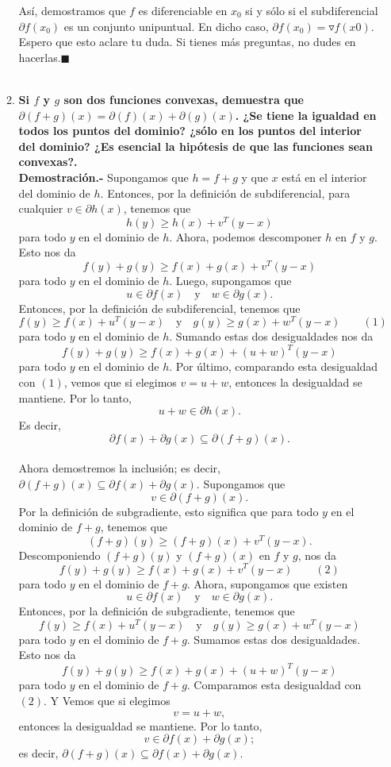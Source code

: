 \begin{enumerate}
\begin{enumerate}[\bfseries (a)]
		Así, demostramos que $f$ es diferenciable en $x_0$ si y sólo si el subdiferencial $\partial f(x_0)$ es un conjunto unipuntual. En dicho caso, $\partial f(x_0) = {\triangledown f(x0)}$. Espero que esto aclare tu duda. Si tienes más preguntas, no dudes en hacerlas.$\blacksquare$\\\\


	    \item  \textbf{\boldmath Si $f$ y $g$ son dos funciones convexas, demuestra que $\partial (f+g)(x) = \partial (f)(x)+\partial (g)(x)$. ¿Se tiene la igualdad en todos los puntos del dominio? ¿sólo en los puntos del interior del dominio? ¿Es esencial la hipótesis de que las funciones sean convexas?.}\\

		\textbf{Demostración.-}\; Supongamos que $h = f + g$ y que $x$ está en el interior del dominio de $h$. Entonces, por la definición de subdiferencial, para cualquier $v \in \partial h(x)$, tenemos que 
		$$h(y) \geq h(x) + v^T (y - x)$$ 
		para todo $y$ en el dominio de $h$. Ahora, podemos descomponer $h$ en $f$ y $g$. Esto nos da 
		$$f(y) + g(y) \geq f(x) + g(x) + v^T (y - x)$$ 
		para todo $y$ en el dominio de $h$. Luego, supongamos que 
		$$u \in \partial f(x) \quad \text{y} \quad w \in \partial g(x).$$ 
		Entonces, por la definición de subdiferencial, tenemos que 
		$$f(y) \geq f(x) + u^T (y - x) \quad \text{y}\quad g(y) \geq g(x) + w^T (y - x)\qquad (1)$$ 
		para todo $y$ en el dominio de $h$. Sumando estas dos desigualdades nos da 
		$$f(y) + g(y) \geq f(x) + g(x) + (u + w)^T (y - x)$$ 
		para todo $y$ en el dominio de $h$. Por último, comparando esta desigualdad con $(1)$, vemos que si elegimos $v = u + w$, entonces la desigualdad se mantiene. Por lo tanto, 
		$$u + w \in \partial h(x).$$ 
		Es decir, 
		$$\partial f(x) + \partial g(x) \subseteq \partial (f+g)(x).$$\\

		Ahora demostremos la inclusión; es decir, $\partial (f+g)(x) \subseteq \partial f(x) + \partial g(x)$. Supongamos que 
		$$v \in \partial (f+g)(x).$$
		Por la definición de subgradiente, esto significa que para todo $y$ en el dominio de $f+g$, tenemos que 
		$$(f+g)(y) \geq (f+g)(x) + v^T (y - x).$$
		Descomponiendo $(f+g)(y)$ y $(f+g)(x)$ en $f$ y $g$, nos da 
		$$f(y) + g(y) \geq f(x) + g(x) + v^T (y - x) \qquad (2)$$ 
		para todo $y$ en el dominio de $f+g$. Ahora, supongamos que existen 
		$$u \in \partial f(x) \quad \text{y} \quad w \in \partial g(x).$$
		Entonces, por la definición de subgradiente, tenemos que 
		$$f(y) \geq f(x) + u^T (y - x) \quad \text{y}\quad g(y) \geq g(x) + w^T (y - x)$$ 
		para todo $y$ en el dominio de $f+g$. Sumamos estas dos desigualdades. Esto nos da 
		$$f(y) + g(y) \geq f(x) + g(x) + (u + w)^T (y - x)$$ 
		para todo $y$ en el dominio de $f+g$. Comparamos esta desigualdad con $(2)$. Y Vemos que si elegimos 
		$$v = u + w,$$ 
		entonces la desigualdad se mantiene. Por lo tanto, 
		$$v \in \partial f(x) + \partial g(x);$$
		es decir, $\partial (f+g)(x) \subseteq \partial f(x) + \partial g(x)$.\\


\end{enumerate}
\end{enumerate}
